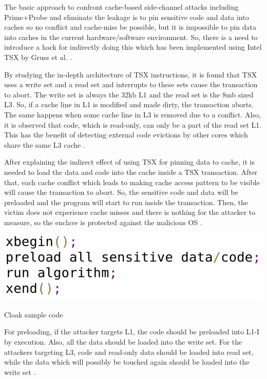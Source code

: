 The basic approach to confront cache-based side-channel attacks including Prime+Probe and eliminate the leakage is to pin sensitive code and data into caches so no conflict and cache-miss be possible, but it is impossible to pin data into caches in the current hardware/software environment. So, there is a need to introduce a hack for indirectly doing this which has been implemented using Intel TSX by Gruss et al. \cite{cloak}.

By studying the in-depth architecture of TSX instructions, it is found that TSX uses a write set and a read set and interrupts to these sets cause the transaction to abort. The write set is always the 32kb L1 and the read set is the 8mb sized L3. So, if a cache line in L1 is modified and made dirty, the transaction aborts. The same happens when some cache line in L3 is removed due to a conflict. Also, it is observed that code, which is read-only, can only be a part of the read set L1. This has the benefit of detecting external code evictions by other cores which share the same L3 cache \cite{cloak}.

After explaining the indirect effect of using TSX for pinning data to cache, it is needed to load the data and code into the cache inside a TSX transaction. After that, each cache conflict which leads to making cache access pattern to be visible will cause the transaction to abort. So, the sensitive code and data will be preloaded and the program will start to run inside the transaction. Then, the victim does not experience cache misses and there is nothing for the attacker to measure, so the enclave is protected against the malicious OS \cite{cloak}.

\begin{algorithm}[t]
	\includegraphics[scale=0.25]{images/cloakcode}
	\caption{Cloak sample code \cite{cloak}}
	\label{alg:cloak}
\end{algorithm}

For preloading, if the attacker targets L1, the code should be preloaded into L1-I by execution. Also, all the data should be loaded into the write set. For the attackers targeting L3, code and read-only data should be loaded into read set, while the data which will possibly be touched again should be loaded into the write set \cite{cloak}.

